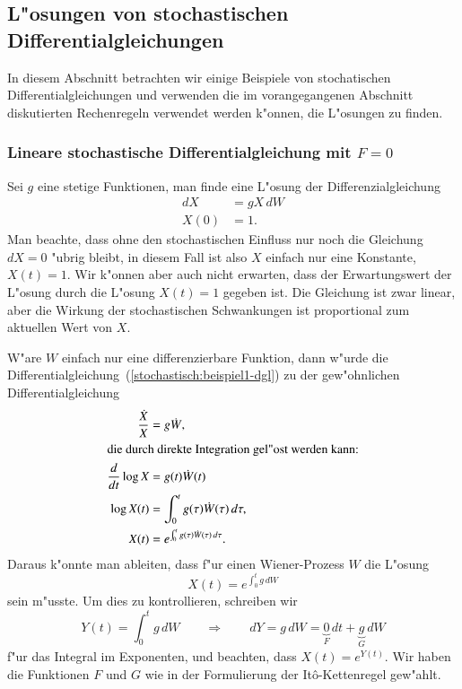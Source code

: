 %
%
\subsection{L"osungen von stochastischen Differentialgleichungen}
In diesem Abschnitt betrachten wir einige Beispiele von stochatischen
Differentialgleichungen und verwenden die im vorangegangenen Abschnitt
diskutierten Rechenregeln verwendet werden k"onnen, die L"osungen
zu finden.

\subsubsection{Lineare stochastische Differentialgleichung mit $F=0$}
Sei $g$ eine stetige Funktionen, man finde eine L"osung der
Differenzialgleichung
\begin{equation}
\begin{aligned}
dX&=gX\,dW\\
X(0)&=1.
\end{aligned}
\label{stochastisch:beispiel1-dgl}
\end{equation}
Man beachte, dass ohne den stochastischen Einfluss nur noch die Gleichung
$dX=0$ "ubrig bleibt, in diesem Fall ist also $X$ einfach nur eine
Konstante, $X(t)=1$.
Wir k"onnen aber auch nicht erwarten, dass der Erwartungswert der
L"osung durch die L"osung $X(t)=1$ gegeben ist.
Die Gleichung ist zwar linear, aber die Wirkung der stochastischen
Schwankungen ist proportional zum aktuellen Wert von $X$.

W"are $W$ einfach nur eine differenzierbare Funktion, dann w"urde die
Differentialgleichung~(\ref{stochastisch:beispiel1-dgl}) zu der
gew"ohnlichen Differentialgleichung
\begin{align*}
\frac{\dot X}{X} &= g\dot W,
\\
\intertext{die durch direkte Integration gel"ost werden kann:}
\frac{d}{dt}\log X&= g(t) \dot W(t)
\\
\log X(t)&=\int_0^t g(\tau)\dot W(\tau)\,d\tau,
\\
X(t)&=e^{\int_0^t g(\tau)\dot W(\tau)\,d\tau}.
\end{align*}
Daraus k"onnte man ableiten, dass f"ur einen Wiener-Prozess $W$ die L"osung
\[
X(t)=e^{\int_0^t g\,dW}
\]
sein m"usste.
Um dies zu kontrollieren, schreiben wir 
\[
Y(t)=\int_0^t g\,dW
\qquad\Rightarrow\qquad
dY = g\,dW = \underbrace{0}_{\textstyle F}\,dt
+
\underbrace{g}_{\textstyle G}\,dW
\]
f"ur das Integral im Exponenten, und beachten, dass $X(t)=e^{Y(t)}$.
Wir haben die Funktionen $F$ und $G$ wie in der Formulierung der
It\^o-Kettenregel gew"ahlt.

